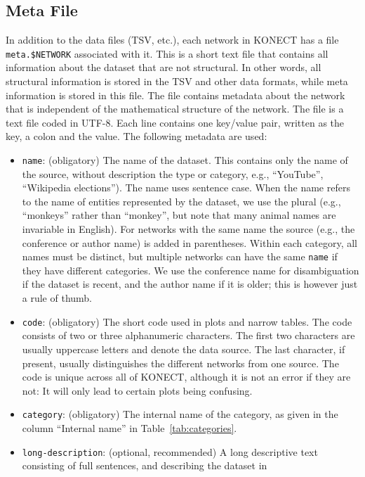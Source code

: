 \documentclass{article}
\begin{document}
\subsection{Meta File}
In addition to the data files (TSV, etc.), each network in KONECT has a
file \texttt{meta.\$NETWORK} associated with it.  This is a short text
file that contains all information about the dataset that are not
structural.  In other words, all structural information is stored in the
TSV and other data formats, while meta information is stored in this
file. 
The file contains metadata about the
network that is independent of the mathematical structure of the
network.  
The file is a text file coded in UTF-8.  Each line
contains one key/value pair, written as the key, a colon and the
value.  The following metadata are used:
\begin{itemize}
\item \texttt{name}: (obligatory) The name of the dataset.  This contains only the
  name of the source, without description the type or category,
  e.g., ``YouTube'', ``Wikipedia elections'').  The name uses
  sentence case.
  When the name refers to the name of entities represented by the
  dataset, we use the plural (e.g., ``monkeys'' rather than ``monkey'',
  but note that many animal names are invariable in English).  
  For networks with the same name the source (e.g.,
  the conference or author name) is added in parentheses.  Within each category,
  all names must be distinct, but multiple networks can have the same
  \texttt{name} if they have different categories.  We use the
  conference name for disambiguation if the dataset is recent, and the
  author name if it is older; this is however just a rule of thumb. 
\item \texttt{code}: (obligatory) The short code used in plots and narrow
  tables.  The code consists of two or three alphanumeric characters.  The first
  two characters are usually uppercase letters and denote the data
  source.  The last character, if present, usually distinguishes
  the different networks from one source.  The code is unique across all
  of KONECT, although it is not an error if they are not:  It will only
  lead to certain plots being confusing. 
\item \texttt{category}: (obligatory) The internal name of the category, as given in the
  column ``Internal name'' in Table~\ref{tab:categories}.
\item \texttt{long-description}: (optional, recommended) A long descriptive
  text consisting of full sentences, and describing the dataset in

\end{itemize}
\end{document}
